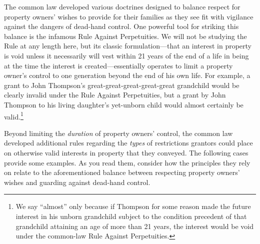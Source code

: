 The common law developed various doctrines designed to balance respect for
property owners' wishes to provide for their families as they see fit with
vigilance against the dangers of dead-hand control. One powerful tool for
striking this balance is the infamous Rule Against Perpetuities. We will not be
studying the Rule at any length here, but its classic formulation---that an
interest in property is void unless it necessarily will vest within 21 years of
the end of a life in being at the time the interest is created---essentially
operates to limit a property owner's control to one generation beyond the end
of his own life. For example, a grant to John Thompson's
great-great-great-great-great grandchild would be clearly invalid under the
Rule Against Perpetuities, but a grant by John Thompson to his living
daughter's yet-unborn child would almost certainly be valid.\footnote{We say
``almost'' only because if Thompson for some reason made the future interest in
his unborn grandchild subject to the condition precedent of that grandchild
attaining an age of more than 21 years, the interest would be void under the
common-law Rule Against Perpetuities.}

Beyond limiting the \textit{duration} of property owners' control, the common
law developed additional rules regarding the \textit{types} of restrictions
grantors could place on otherwise valid interests in property that they
conveyed. The following cases provide some examples. As you read them, consider
how the principles they rely on relate to the aforementioned balance between
respecting property owners' wishes and guarding against dead-hand control.

